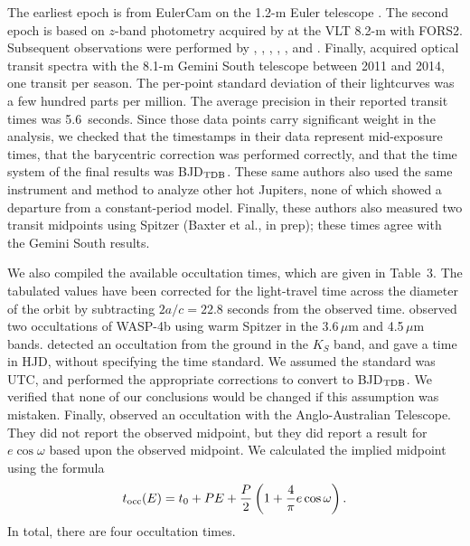 \documentclass[12pt,twocolumn,tighten]{aastex62}
\begin{document}
The earliest epoch is from EulerCam on the 1.2-m Euler telescope
\citep{wilson_wasp-4b_2008}.  The second epoch is based on $z$-band
photometry acquired by \citet{gillon_improved_2009} at the VLT 8.2-m
with FORS2.  Subsequent observations were performed by
\citet{winn_transit_2009}, \citet{dragomir_terms_2011},
\citet{sanchis-ojeda_starspots_2011}, \citet{nikolov_wasp-4b_2012},
\citet{hoyer_tramos_2013}, and \citet{ranjan_atmospheric_2014}.
Finally, \citet{huitson_gemini_2017} acquired optical transit spectra
with the 8.1-m Gemini South telescope between 2011 and 2014, one
transit per season.  The per-point standard deviation of their
lightcurves was a few hundred parts per million.  The average
precision in their reported transit times was 5.6~seconds.  Since
those data points carry significant weight in the analysis, we checked
that the timestamps in their data represent mid-exposure times, that
the barycentric correction was performed correctly, and that the time
system of the final results was BJD$_{\rm TDB}$.  These same authors
also used the same instrument and method to analyze other hot
Jupiters, none of which showed a departure from a constant-period
model.  Finally, these authors also measured two transit midpoints
using Spitzer (Baxter et al., in prep); these
times agree with the Gemini South results.

We also compiled the available occultation times, which are given in
Table~3.  The tabulated values have been corrected for the
light-travel time across the diameter of the orbit by subtracting
$2a/c = 22.8$ seconds from the observed time.
\citet{beerer_secondary_2011} observed two occultations of WASP-4b
using warm Spitzer in the 3.6\,$\mu$m and 4.5\,$\mu$m bands.
\citet{caceres_ground-based_2011} detected an occultation from the
ground in the $K_S$ band, and gave a time in HJD, without specifying
the time standard.  We assumed the standard was UTC, and performed the
appropriate corrections to convert to BJD$_{\rm TDB}$.  We verified
that none of our conclusions would be changed if this assumption was
mistaken. Finally, \citet{zhou_secondary_2015} observed an occultation
with the Anglo-Australian Telescope.  They did not report the observed
midpoint, but they did report a result for $e\cos\omega$ based upon
the observed midpoint.  We calculated the implied midpoint using the
formula \citep[{\it e.g.},][]{winn_exoplanet_2010}
\begin{equation}
  t_{\rm occ}(E) =
  t_0 +  P E  +
  \frac{P}{2} \left( 1 + \frac{4}{\pi} e\cos\omega \right).
  \label{eq:occultation_time}
\end{equation}
In total, there are four occultation times.
\end{document}
